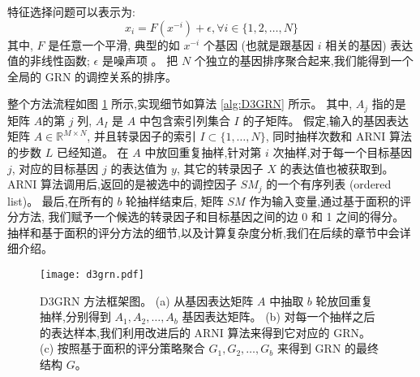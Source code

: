 特征选择问题可以表示为:
\begin{equation}
\label{eq:fs}
x_i =  F(x^{-i}) + \epsilon , \forall i \in \{1,2,\ldots,N\}
\end{equation}
其中, $F$ 是任意一个平滑, 典型的如 $x^{-i}$ 个基因 (也就是跟基因 $i$ 相关的基因) 表达值的非线性函数; $\epsilon$ 是噪声项 \cite{huynh2010inferring,Haury2012}。
把 $N$ 个独立的基因排序聚合起来,我们能得到一个全局的 GRN 的调控关系的排序。


整个方法流程如图 \ref{d3grn} 所示,实现细节如算法 \ref{alg:D3GRN} 所示。
其中, $A_j$ 指的是矩阵 $A$的第 $j$ 列, $A_I$ 是 $A$ 中包含索引列集合 $I$ 的子矩阵。
假定,输入的基因表达矩阵 $A \in \mathbb{R}^{M \times N}$, 
并且转录因子的索引 $I \subset \{1,\ldots,N\}$, 
同时抽样次数和 ARNI 算法的步数 $L$ 已经知道。
在 $A$ 中放回重复抽样,针对第 $i$ 次抽样,对于每一个目标基因 $j$, 
对应的目标基因 $j$ 的表达值为 $y$, 
其它的转录因子 $X$ 的表达值也被获取到。
ARNI 算法调用后,返回的是被选中的调控因子 $SM_j$ 的一个有序列表 (ordered list)。
最后,在所有的 $b$ 轮抽样结束后,
矩阵 $SM$ 作为输入变量,通过基于面积的评分方法,
我们赋予一个候选的转录因子和目标基因之间的边 0 和 1 之间的得分。
抽样和基于面积的评分方法的细节,以及计算复杂度分析,我们在后续的章节中会详细介绍。
 
\begin{figure}[!htbp]
  \centering
  \texttt{[image: d3grn.pdf]}
  \caption{D3GRN 方法框架图。
  (a) 从基因表达矩阵 $A$ 中抽取 $b$ 轮放回重复抽样,分别得到 $A_1,A_2,\ldots,A_{b}$ 基因表达矩阵。
  (b) 对每一个抽样之后的表达样本,我们利用改进后的 ARNI 算法来得到它对应的 GRN。
  (c) 按照基于面积的评分策略聚合 $G_1, G_2, \ldots, G_b$ 来得到 GRN 的最终结构 $G$。
  }
  \label{d3grn}
\end{figure}

